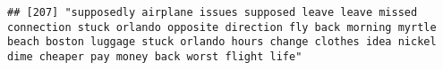 \documentclass[
]{article}
\begin{document}
\begin{verbatim}
## [207] "supposedly airplane issues supposed leave leave missed connection stuck orlando opposite direction fly back morning myrtle beach boston luggage stuck orlando hours change clothes idea nickel dime cheaper pay money back worst flight life"                                                                                                                                                                                                                                                                                                                                                                                                                                                                                                                                                                                                                                                                                                                                                                                                                                                                                                                                                                                                                                                                                                                                                                                                                                                                                                                                                                                                                                                                                                                                                  

\end{verbatim}
\end{document}

